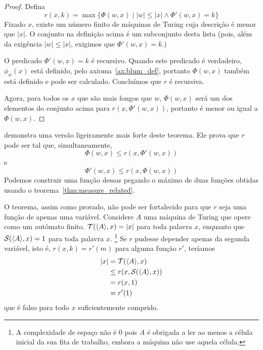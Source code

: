 \begin{proof}
    Defina
    \begin{equation*}
        r( x, k ) = \max \{ \Phi(w, x) \mid |w| \leq |x| \land \Phi'(w, x) = k \}
    \end{equation*}
    Fixado $x$, existe um número finito de máquinas de Turing
    cuja descrição é menor que $|x|$.
    O conjunto na definição acima é um subconjunto desta lista
    (pois, além da exigência $|w| \leq |x|$,
    exigimos que $\Phi'(w, x) = k$.)

    O predicado $\Phi'(w, x) = k$ é recursivo.
    Quando este predicado é verdadeiro,
    $\phi_w(x)$ está definido, pelo axioma~\ref{ax:blum_def},
    portanto $\Phi(w, x)$ também está definido e pode ser calculado.
    Concluímos que $r$ é recursiva.

    Agora, para todos os $x$ que são mais longos que $w$,
    $\Phi(w, x)$ será um dos elementos do conjunto acima
    para $r(x, \Phi'(w, x))$,
    portanto é menor ou igual a $\Phi(w, x)$.
\end{proof}

 demonstra uma versão ligeiramente mais forte
deste teorema.
Ele prova que $r$ pode ser tal que,
simultaneamente,
\begin{equation*}
    \Phi(w, x) \leq r( x, \Phi'(w, x))
\end{equation*}
e
\begin{equation*}
    \Phi'(w, x) \leq r( x, \Phi(w, x))
\end{equation*}
Podemos construir uma função dessas
pegando o máximo de duas funções obtidas
usando o teorema~\ref{thm:measure_related}.

O teorema,
assim como provado,
não pode ser fortalecido
para que $r$ seja uma função de apenas uma variável.
Considere $A$ uma máquina de Turing
que opere como um autômato finito.
${\mathcal{T}}(\langle A \rangle, x) = |x|$ para toda palavra $x$,
enquanto que ${\mathcal{S}}(\langle A \rangle, x) = 1$ para toda palavra $x$.%
\footnote{
    A complexidade de espaço não é $0$
    pois $A$ é obrigada a ler
    ao menos a célula inicial da sua fita de trabalho,
    embora a máquina não use aquela célula.
}
Se $r$ pudesse depender apenas da segunda variável,
isto é, $r(x, k) = r'(m)$ para alguma função $r'$,
teríamos
\begin{align*}
    |x| &= {\mathcal{T}}(\langle A \rangle, x) \\
        &\leq r(x, {\mathcal{S}}(\langle A \rangle, x)) \\
        &= r(x, 1) \\
        &= r'(1)
\end{align*}
que é falso para todo $x$ suficientemente comprido.

